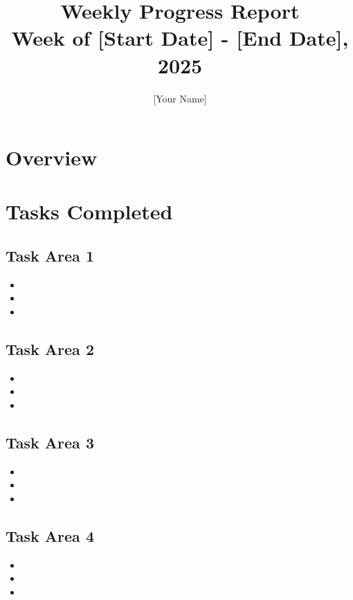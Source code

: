 \documentclass{article}
\title{\textbf{Weekly Progress Report}\\[0.5em]\Large{Week of [Start Date] - [End Date], 2025}}
\author{[Your Name]}
\date{}
\begin{document}
\maketitle

\section{Overview}

\section{Tasks Completed}

\subsection{Task Area 1}
\begin{itemize}
  \item 
  \item 
  \item 
\end{itemize}

\subsection{Task Area 2}
\begin{itemize}
  \item 
  \item 
  \item 
\end{itemize}

\subsection{Task Area 3}
\begin{itemize}
  \item 
  \item 
  \item 
\end{itemize}

\subsection{Task Area 4}
\begin{itemize}
  \item 
  \item 
  \item 
\end{itemize}
\end{document}
